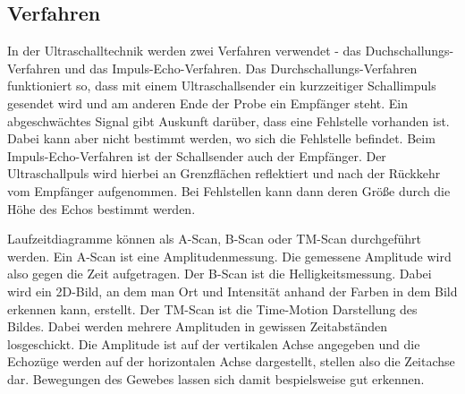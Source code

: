 \subsection{Verfahren}
In der Ultraschalltechnik werden zwei Verfahren verwendet - 
das Duchschallungs-Verfahren und das Impuls-Echo-Verfahren. 
\newline
Das Durchschallungs-Verfahren funktioniert so, dass mit einem 
Ultraschallsender ein kurzzeitiger Schallimpuls gesendet wird 
und am anderen Ende der Probe ein Empfänger steht. Ein 
abgeschwächtes Signal gibt Auskunft darüber, dass eine 
Fehlstelle vorhanden ist. Dabei kann aber nicht bestimmt 
werden, wo sich die Fehlstelle befindet.
\newline
Beim Impuls-Echo-Verfahren ist der Schallsender auch der 
Empfänger. Der Ultraschallpuls wird hierbei an Grenzflächen 
reflektiert und nach der Rückkehr vom Empfänger aufgenommen. 
Bei Fehlstellen kann dann deren Größe durch die Höhe des Echos
bestimmt werden. 

\noindent Laufzeitdiagramme können als A-Scan, B-Scan oder TM-Scan 
durchgeführt werden. Ein A-Scan ist eine Amplitudenmessung. Die gemessene Amplitude wird also gegen die Zeit 
aufgetragen. Der B-Scan ist die Helligkeitsmessung. Dabei wird ein 2D-Bild, an dem man Ort und Intensität anhand 
der Farben in dem Bild erkennen kann, erstellt. Der TM-Scan ist die Time-Motion Darstellung des Bildes. 
Dabei werden mehrere Amplituden in gewissen Zeitabständen losgeschickt. 
Die Amplitude ist auf der vertikalen Achse angegeben und die Echozüge werden auf der horizontalen Achse dargestellt, 
stellen also die Zeitachse dar. Bewegungen des Gewebes lassen sich damit bespielsweise gut erkennen. 
